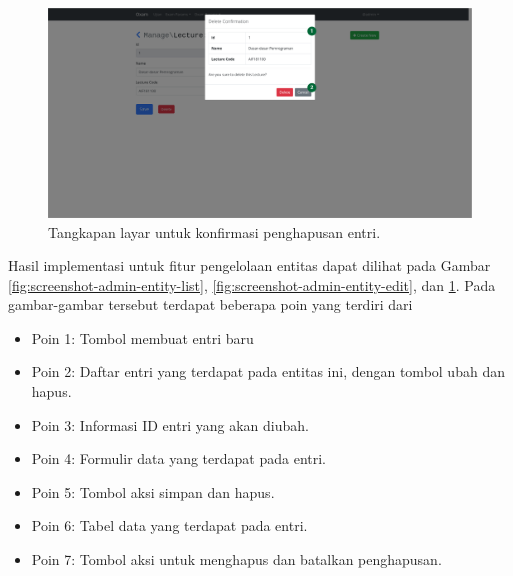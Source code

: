     \begin{figure}
        \centering
        \includegraphics[width=0.7\paperwidth]{Gambar/implemented-interface/admin/entity-delete.png}
        \caption{Tangkapan layar untuk konfirmasi penghapusan entri.}
        \label{fig:screenshot-admin-entity-delete}
    \end{figure}
    Hasil implementasi untuk fitur pengelolaan entitas dapat dilihat pada Gambar \ref{fig:screenshot-admin-entity-list},
    \ref{fig:screenshot-admin-entity-edit}, dan \ref{fig:screenshot-admin-entity-delete}.
    Pada gambar-gambar tersebut terdapat beberapa poin yang terdiri dari
    \begin{itemize}
        \item Poin 1: Tombol membuat entri baru
        \item Poin 2: Daftar entri yang terdapat pada entitas ini, dengan tombol ubah dan hapus.
        \item Poin 3: Informasi ID entri yang akan diubah.
        \item Poin 4: Formulir data yang terdapat pada entri.
        \item Poin 5: Tombol aksi simpan dan hapus.
        \item Poin 6: Tabel data yang terdapat pada entri.
        \item Poin 7: Tombol aksi untuk menghapus dan batalkan penghapusan.
    \end{itemize}
    
    
